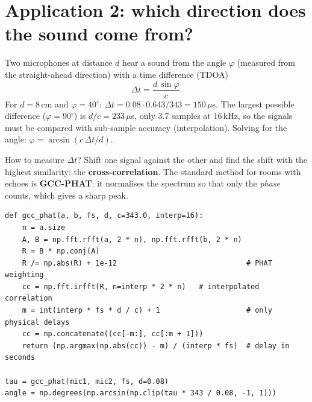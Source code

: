 \section*{Application 2: which direction does the sound come from?}
Two microphones at distance $d$ hear a sound from the angle $\varphi$ (measured from the straight-ahead direction) with a time difference (TDOA)
\[
\Delta t=\frac{d\,\sin\varphi}{c}.
\]
For $d=8$\,cm and $\varphi=40^\circ$: $\Delta t=0.08\cdot0.643/343=150\,\mu$s. The largest possible difference ($\varphi=90^\circ$) is $d/c=233\,\mu$s, only $3.7$ samples at $16$\,kHz, so the signals must be compared with sub-sample accuracy (interpolation). Solving for the angle: $\varphi=\arcsin(c\,\Delta t/d)$.
\begin{center}
\label{fig:hw5_tdoa}
\end{center}
How to measure $\Delta t$? Shift one signal against the other and find the shift with the highest similarity: the \textbf{cross-correlation}. The standard method for rooms with echoes is \textbf{GCC-PHAT}: it normalises the spectrum so that only the \emph{phase} counts, which gives a sharp peak.
\begin{verbatim}
def gcc_phat(a, b, fs, d, c=343.0, interp=16):
    n = a.size
    A, B = np.fft.rfft(a, 2 * n), np.fft.rfft(b, 2 * n)
    R = B * np.conj(A)
    R /= np.abs(R) + 1e-12                              # PHAT weighting
    cc = np.fft.irfft(R, n=interp * 2 * n)   # interpolated correlation
    m = int(interp * fs * d / c) + 1                    # only physical delays
    cc = np.concatenate((cc[-m:], cc[:m + 1]))
    return (np.argmax(np.abs(cc)) - m) / (interp * fs)  # delay in seconds

tau = gcc_phat(mic1, mic2, fs, d=0.08)
angle = np.degrees(np.arcsin(np.clip(tau * 343 / 0.08, -1, 1)))
\end{verbatim}
